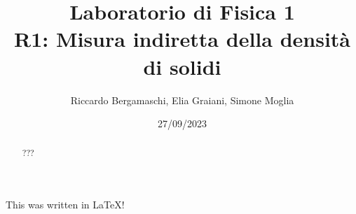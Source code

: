 \documentclass{article}
\title{
    Laboratorio di Fisica 1\\
    R1: Misura indiretta della densità di solidi
}
\author{Riccardo Bergamaschi, Elia Graiani, Simone Moglia}
\date{27/09/2023}
\begin{document}
\maketitle
\begin{abstract}
    ???
\end{abstract}
This was written in \LaTeX !
\end{document}
